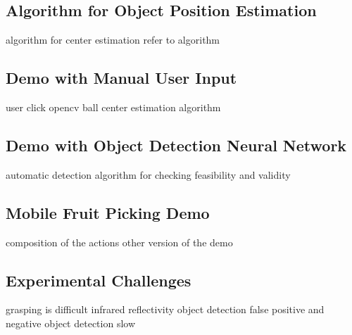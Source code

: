 \subsection{Algorithm for Object Position Estimation}

algorithm for center estimation
refer to algorithm 

\subsection{Demo with Manual User Input}

user click opencv
ball center estimation algorithm

\subsection{Demo with Object Detection Neural Network}

automatic detection
algorithm for checking feasibility and validity

\subsection{Mobile Fruit Picking Demo}

composition of the actions
other version of the demo

\subsection{Experimental Challenges}

grasping is difficult
infrared reflectivity
object detection false positive and negative
object detection slow

